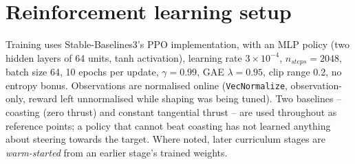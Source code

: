 \section{Reinforcement learning setup}
\label{sec:rl-setup}

Training uses Stable-Baselines3's \parencite{raffin2021sb3} PPO implementation, with an MLP policy (two hidden layers of 64 units, tanh
activation), learning rate $3\times10^{-4}$, $n_{steps}=2048$, batch size 64, 10 epochs per
update, $\gamma=0.99$, GAE $\lambda=0.95$, clip range 0.2, no entropy bonus. Observations are
normalised online (\texttt{VecNormalize}, observation-only, reward left unnormalised while
shaping was being tuned). Two baselines -- coasting (zero thrust) and constant tangential thrust
-- are used throughout as reference points; a policy that cannot beat coasting has not learned
anything about steering towards the target. Where noted, later curriculum stages are
\emph{warm-started} from an earlier stage's trained weights.
